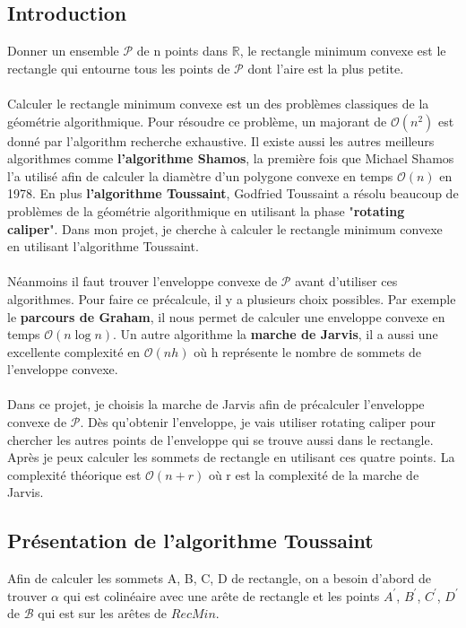 \documentclass[14px]{article}
\begin{document}
\subsection{Introduction}
Donner un ensemble $\mathcal{P}$ de n points dans $\mathbb{R}$, le rectangle minimum convexe est le rectangle qui entourne tous les points de $\mathcal{P}$ dont l'aire est la plus petite.\\\\
Calculer le rectangle minimum convexe est un des problèmes classiques de la géométrie algorithmique. Pour résoudre ce problème, un majorant de $\mathcal{O}(n^2)$ est donné par l'algorithm recherche exhaustive. Il existe aussi les autres meilleurs algorithmes comme \textbf{l'algorithme Shamos}, la première fois que Michael Shamos l'a utilisé afin de calculer la diamètre d’un polygone convexe en temps $\mathcal{O}(n)$ en 1978. En plus \textbf{l'algorithme Toussaint}, Godfried Toussaint a résolu beaucoup de problèmes de la géométrie algorithmique en utilisant la phase "\textbf{rotating caliper}". Dans mon projet, je cherche à calculer le rectangle minimum convexe en utilisant l'algorithme Toussaint.\\\\
Néanmoins il faut trouver l'enveloppe convexe de $\mathcal{P}$ avant d'utiliser ces algorithmes. Pour faire ce précalcule, il y a plusieurs choix possibles. Par exemple le \textbf{parcours de Graham}, il nous permet de calculer une enveloppe convexe en temps $\mathcal{O}(n\log n)$. Un autre algorithme la \textbf{marche de Jarvis}, il a aussi une excellente complexité en $\mathcal{O}(nh)$ où h représente le nombre de sommets de l'enveloppe convexe. \\\\
Dans ce projet, je choisis la marche de Jarvis afin de précalculer l'enveloppe convexe de $\mathcal{P}$. Dès qu’obtenir l'enveloppe, je vais utiliser rotating caliper pour chercher les autres points de l'enveloppe qui se trouve aussi dans le rectangle. Après je peux calculer les sommets de rectangle en utilisant ces quatre points. La complexité théorique est $\mathcal{O}(n + r)$ où r est la complexité de la marche de Jarvis.


\subsection{Présentation de l'algorithme Toussaint}
Afin de calculer les sommets A, B, C, D de rectangle, on a besoin d'abord de trouver $\alpha$ qui est colinéaire avec une arête de rectangle et les points $A^{\prime}$,  $B^{\prime}$, $C^{\prime}$, $D^{\prime}$ de $\mathcal{B}$ qui est sur les arêtes de $RecMin$.
\end{document}

